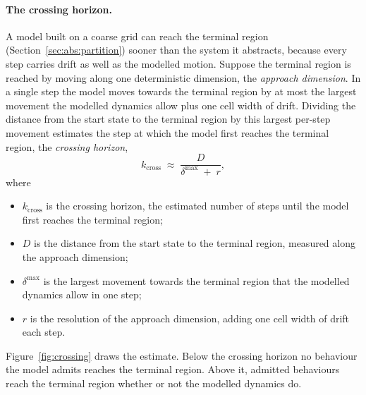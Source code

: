 \documentclass[11pt,a4paper]{article}
\theoremstyle{plain}
\theoremstyle{remark}
\begin{document}
	\paragraph{The crossing horizon.}
	A model built on a coarse grid can reach the terminal region
	(Section~\ref{sec:abs:partition}) sooner than the system it
	abstracts, because every step carries drift as well as the
	modelled motion. Suppose the terminal region is reached by moving
	along one deterministic dimension, the \emph{approach dimension}.
	In a single step the model moves towards the terminal region by at
	most the largest movement the modelled dynamics allow plus one
	cell width of drift. Dividing the distance from the start state to
	the terminal region by this largest per-step movement estimates
	the step at which the model first reaches the terminal region, the
	\emph{crossing horizon},
	\begin{equation}
		k_{\text{cross}} \;\approx\; \frac{D}{\delta^{\max} \;+\; r},
		\label{eq:budget}
	\end{equation}
	where
	\begin{itemize}
		\item $k_{\text{cross}}$ is the crossing horizon, the
		estimated number of steps until the model first reaches the
		terminal region;
		\item $D$ is the distance from the start state to the terminal
		region, measured along the approach dimension;
		\item $\delta^{\max}$ is the largest movement towards the
		terminal region that the modelled dynamics allow in one step;
		\item $r$ is the resolution of the approach dimension, adding
		one cell width of drift each step.
	\end{itemize}
	Figure~\ref{fig:crossing} draws the estimate. Below the crossing
	horizon no behaviour the model admits reaches the terminal region.
	Above it, admitted behaviours reach the terminal region whether or
	not the modelled dynamics do.
	
\end{document}
